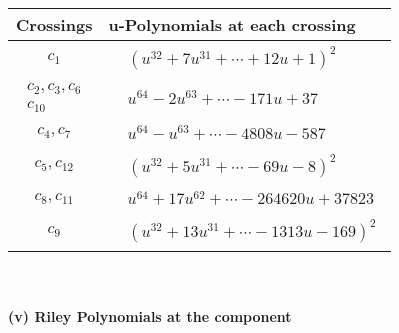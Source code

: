 \documentclass[1p]{elsarticle_modified}
\theoremstyle{definition}
\begin{document}
\begin{tabular}{m{50pt}|m{274pt}}
Crossings & \hspace{64pt}u-Polynomials at each crossing \\
\hline $$\begin{aligned}c_{1}\end{aligned}$$&$\begin{aligned}
&(u^{32}+7 u^{31}+\cdots+12 u+1)^{2}
\end{aligned}$\\
\hline $$\begin{aligned}c_{2},c_{3},c_{6}\\c_{10}\end{aligned}$$&$\begin{aligned}
&u^{64}-2 u^{63}+\cdots-171 u+37
\end{aligned}$\\
\hline $$\begin{aligned}c_{4},c_{7}\end{aligned}$$&$\begin{aligned}
&u^{64}- u^{63}+\cdots-4808 u-587
\end{aligned}$\\
\hline $$\begin{aligned}c_{5},c_{12}\end{aligned}$$&$\begin{aligned}
&(u^{32}+5 u^{31}+\cdots-69 u-8)^{2}
\end{aligned}$\\
\hline $$\begin{aligned}c_{8},c_{11}\end{aligned}$$&$\begin{aligned}
&u^{64}+17 u^{62}+\cdots-264620 u+37823
\end{aligned}$\\
\hline $$\begin{aligned}c_{9}\end{aligned}$$&$\begin{aligned}
&(u^{32}+13 u^{31}+\cdots-1313 u-169)^{2}
\end{aligned}$\\
\hline
\end{tabular}\\~\\
\newpage\renewcommand{\arraystretch}{1}
\flushleft \textbf{(v) Riley Polynomials at the component}\newline \\
\end{document}
